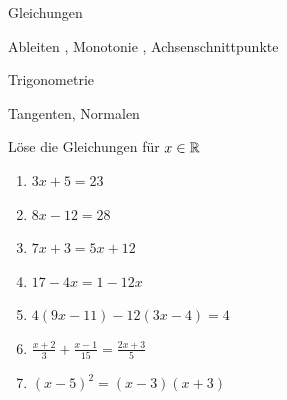 



\begin{inhalt}
  \item Gleichungen 
  \item Ableiten , Monotonie , Achsenschnittpunkte 
	\item Trigonometrie 
	\item Tangenten, Normalen 
\end{inhalt}



 Löse die Gleichungen für $x\in \mathbb{R}$
\begin{multicols}{2}
  \begin{enumerate}
    \item $3x + 5 = 23$
    \item $8x - 12 = 28$
    \item $7x + 3 = 5x + 12$
		\item $17-4x=1-12x$
    \item $4(9x - 11) - 12(3x - 4) = 4$
    \item $\frac{x+2}{3} + \frac{x-1}{15} = \frac{2x+3}{5}$
		\item $(x-5)^2=(x-3)(x+3)$
  \end{enumerate}
\end{multicols}

